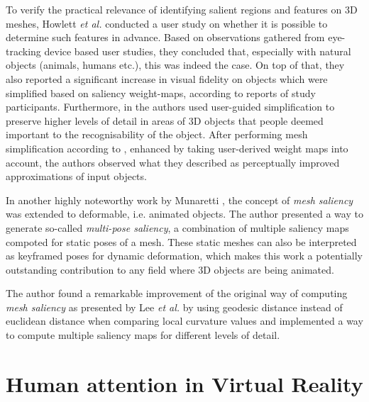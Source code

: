 To verify the practical relevance of identifying salient regions and features on 3D meshes, Howlett \textit{et al.} \cite{howlett2005predicting} conducted a user study on whether it is possible to determine such features in advance. Based on observations gathered from eye-tracking device based user studies, they concluded that, especially with natural objects (animals, humans etc.), this was indeed the case. On top of that, they also reported a significant increase in visual fidelity on objects which were simplified based on saliency weight-maps, according to reports of study participants. Furthermore, in \cite{kho2003user} the authors used user-guided simplification to preserve higher levels of detail in areas of 3D objects that people deemed important to the recognisability of the object. After performing mesh simplification according to \cite{garland1997qslim}, enhanced by taking user-derived weight maps into account, the authors observed what they described as perceptually improved approximations of input objects.

In another highly noteworthy work by Munaretti \cite{munaretti2007perceptual}, the concept of \textit{mesh saliency} was extended to deformable, i.e. animated objects. The author presented a way to generate so-called \textit{multi-pose saliency}, a combination of multiple saliency maps compoted for static poses of a mesh. These static meshes can also be interpreted as keyframed poses for dynamic deformation, which makes this work a potentially outstanding contribution to any field where 3D objects are being animated.

The author found a remarkable improvement of the original way of computing \textit{mesh saliency} as presented by Lee \textit{et al.} by using geodesic distance \cite{surazhsky2005fast} instead of euclidean distance when comparing local curvature values and implemented a way to compute multiple saliency maps for different levels of detail.

\section{Human attention in Virtual Reality}
\label{sec:human_attention_in_virtual_reality}

